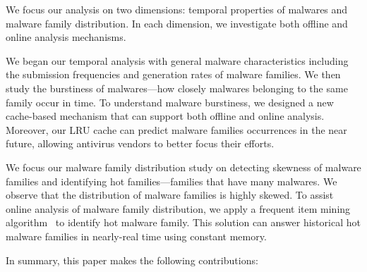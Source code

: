 We focus our analysis on two dimensions: temporal properties of malwares and 
malware family distribution.
In each dimension, we investigate both offline and online analysis mechanisms.

We began our temporal analysis with general malware characteristics including the submission
frequencies and generation rates of malware families. 
We then study the burstiness of malwares---how closely malwares belonging to the same family occur in time. 
To understand malware burstiness, we designed a new cache-based mechanism 
that can support both offline and online analysis.
Moreover, our LRU cache can predict malware families occurrences in the near future, 
allowing antivirus vendors to better focus their efforts. 

We focus our malware family distribution study on detecting skewness of malware families and identifying hot families---families that have many malwares.
We observe that the distribution of malware families is highly skewed. 
To assist online analysis of malware family distribution, 
we apply a frequent item mining algorithm~\cite{space-saving} to identify hot malware family. 
This solution can answer historical hot malware families in nearly-real time using constant memory. 





In summary, this paper makes the following contributions:


